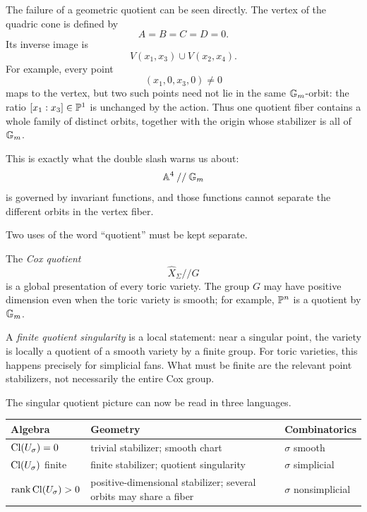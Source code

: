 The failure of a geometric quotient can be seen directly. The vertex
of the quadric cone is defined by
\[
A=B=C=D=0.
\]
Its inverse image is
\[
V(x_1,x_3)
\cup
V(x_2,x_4).
\]
For example, every point
\[
(x_1,0,x_3,0)\neq0
\]
maps to the vertex, but two such points need not lie in the same
\(\mathbb{G}_{m}\)-orbit: the ratio \([x_1:x_3]\in\mathbb{P}^1\) is unchanged by the
action. Thus one quotient fiber contains a whole family of distinct
orbits, together with the origin whose stabilizer is all of \(\mathbb{G}_{m}\).

This is exactly what the double slash warns us about:
\[
\mathbb{A}^4\mathbin{//}\mathbb{G}_{m}
\]
is governed by invariant functions, and those functions cannot
separate the different orbits in the vertex fiber.

\begin{warningbox}
Two uses of the word ``quotient'' must be kept separate.

The \emph{Cox quotient}
\[
\widehat X_\Sigma\mathbin{//}G
\]
is a global presentation of every toric variety. The group \(G\) may
have positive dimension even when the toric variety is smooth; for
example, \(\mathbb{P}^n\) is a quotient by \(\mathbb{G}_{m}\).

A \emph{finite quotient singularity} is a local statement: near a
singular point, the variety is locally a quotient of a smooth variety
by a finite group. For toric varieties, this happens precisely for
simplicial fans. What must be finite are the relevant point
stabilizers, not necessarily the entire Cox group.
\end{warningbox}

\begin{threedictionaries}
The singular quotient picture can now be read in three languages.

\medskip

\begin{center}
\small
\begin{tabularx}{\linewidth}{@{}
  >{\raggedright\arraybackslash}X
  >{\raggedright\arraybackslash}X
  >{\raggedright\arraybackslash}X@{}}
\toprule
\textbf{Algebra}
&
\textbf{Geometry}
&
\textbf{Combinatorics}
\\
\midrule
\(\operatorname{Cl}(U_\sigma)=0\)
&
trivial stabilizer; smooth chart
&
\(\sigma\) smooth
\\
\(\operatorname{Cl}(U_\sigma)\) finite
&
finite stabilizer; quotient singularity
&
\(\sigma\) simplicial
\\
\(\operatorname{rank}\operatorname{Cl}(U_\sigma)>0\)
&
positive-dimensional stabilizer; several orbits may share a fiber
&
\(\sigma\) nonsimplicial
\\
\bottomrule
\end{tabularx}
\end{center}
\end{threedictionaries}


